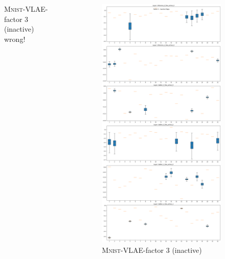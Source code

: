 \documentclass{beamer}
\begin{document}
\begin{frame}
\begin{columns}
\begin{column}{0.3\textwidth}
\begin{figure}
\caption{\textsc{Mnist}-VLAE-factor 3 (inactive) \alert{wrong!}}
\end{figure}
\end{column}
\begin{column}{0.3\textwidth}
\begin{figure}
\centering
\includegraphics[height=.8\textheight]{images/sparseness/encoder_fm3_fms_inactive_correct.png}
\caption{\textsc{Mnist}-VLAE-factor 3 (inactive)}
\end{figure}
\end{column}
\end{columns}
\end{frame}
\end{document}
